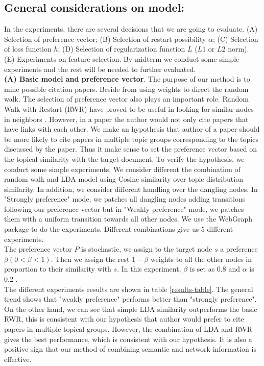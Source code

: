 \documentclass{article} %
\begin{document}
\subsection{General considerations on model:} 
In the experiments, there are several decisions that we are going to evaluate. (A) Selection of preference vector; (B) Selection of restart possibility $\alpha$; (C) Selection of loss function $h$;  (D) Selection of regularization function $L$ ($L1$ or $L2$ norm). (E) Experiments on feature selection. By midterm we conduct some simple experiments and the rest will be needed to further evaluated.\\
\textbf{(A) Basic model and preference vector}. 
The purpose of our method is to mine possible citation papers. Beside from using weights to direct the random walk. The selection of preference vector also plays an important role. Random Walk with Restart (RWR) have proved to be useful in looking for similar nodes in neighbors  \cite{Backstrom:2011:SRW:1935826.1935914,Tong2006}. However, in a paper the author would not only cite papers that have links with each other. We make an hypothesis that author of a paper should be more likely to cite papers in multiple topic groups corresponding to the topics discussed by the paper. Thus it make sense to set the preference vector based on the topical similarity with the target document. To verify the hypothesis, we conduct some simple experiments. We consider different the combination of random walk and LDA model using Cosine similarity over topic distribution similarity. In addition, we consider different handling over the dangling nodes. In "Strongly preference" mode, we patches all dangling nodes adding transitions following our preference vector but in "Weakly preference" mode, we patches them with a uniform transition towards all other nodes. We use the WebGraph\cite{Boldi2004} package to do the experiments. Different combinations give us 5 different experiments.\\
The preference vector $P$ is stochastic, we assign to the target node $s$ a preference $\beta (0< \beta <1)$. Then we assign the rest $1-\beta$ weights to all the other nodes in proportion to their similarity with $s$. In this experiment, $\beta$ is set as 0.8 and $\alpha$ is 0.2 .\\
The different experiments results are shown in table \ref{results-table}. The general trend shows that "weakly preference" performs better than "strongly preference". On the other hand, we can see that simple LDA similarity outperforms the basic RWR, this is consistent with our hypothesis that author would prefer to cite papers in multiple topical groups. However, the combination of LDA and RWR gives the best performance, which is consistent with our hypothesis. It is also a positive sign that our method of combining semantic and network information is effective. \\
\end{document}
